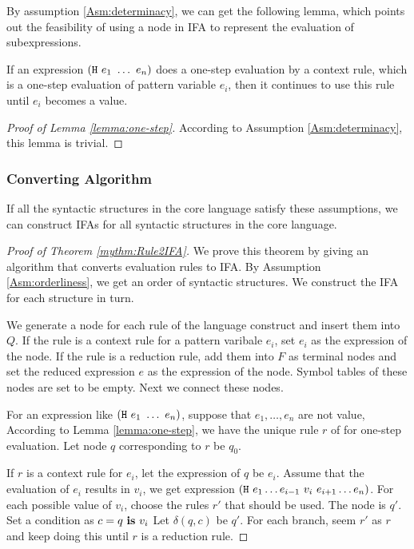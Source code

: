 By assumption \ref{Asm:determinacy}, we can get the following lemma, which points out the feasibility of using a node in IFA to represent the evaluation of subexpressions.

\begin{lemma}
    \label{lemma:one-step}
    If an expression $(\mbox{\tt H}~e_1~\ldots~e_n)$ does a one-step evaluation by a context rule, which is a one-step evaluation of pattern variable $e_i$, then it continues to use this rule until $e_i$ becomes a value.
\end{lemma}

\begin{proof}[Proof of Lemma \ref{lemma:one-step}]
    According to Assumption \ref{Asm:determinacy}, this lemma is trivial.
\end{proof}

\subsubsection{Converting Algorithm}

\begin{mythm}
    \label{mythm:Rule2IFA}
    If all the syntactic structures in the core language satisfy these assumptions, we can construct IFAs for all syntactic structures in the core language.
\end{mythm}

\begin{proof}[Proof of Theorem \ref{mythm:Rule2IFA}]

    We prove this theorem by giving an algorithm that converts evaluation rules to IFA. By Assumption \ref{Asm:orderliness}, we get an order of syntactic structures. We construct the IFA for each structure in turn.

    We generate a node for each rule of the language construct  and insert them into $Q$. If the rule is a context rule for a pattern varibale $e_i$, set $e_i$ as the expression of the node. If the rule is a reduction rule, add them into $F$ as terminal nodes and set the reduced expression $e$ as the expression of the node. Symbol tables of these nodes are set to be empty. Next we connect these nodes.

    For an expression like $(\mbox{\tt H}~e_1~\ldots~e_n)$, suppose that $e_1, \ldots, e_n$ are not value, According to Lemma \ref{lemma:one-step}, we have the unique rule $r$ of  for one-step evaluation. Let node $q$ corresponding to $r$ be $q_0$.

    If $r$ is a context rule for $e_i$, let the expression of $q$ be $e_i$. Assume that the evaluation of $e_i$ results in $v_i$, we get expression $(\mbox{\tt H}~e_1 \ldots e_{i-1}~v_i~e_{i+1} \ldots e_n)$. For each possible value of $v_i$, choose the rules $r'$ that should be used. The node is $q'$. Set a condition as $c=q~\mbox{\rm \bf is}~v_i$ Let $\delta(q, c)$ be $q'$. For each branch, seem $r'$ as $r$ and keep doing this until $r$ is a reduction rule.
\end{proof}

